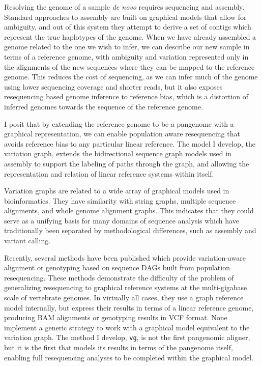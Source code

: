 \documentclass[a4paper,12pt,numbered,oneside]{Classes/PhDThesisPSnPDF}
\begin{document}
Resolving the genome of a sample \emph{de novo} requires sequencing and assembly.
Standard approaches to assembly are built on graphical models that allow for ambiguity, and out of this system they attempt to derive a set of contigs which represent the true haplotypes of the genome.
When we have already assembled a genome related to the one we wish to infer, we can describe our new sample in terms of a reference genome, with ambiguity and variation represented only in the alignments of the new sequences where they can be mapped to the reference genome.
This reduces the cost of sequencing, as we can infer much of the genome using lower sequencing coverage and shorter reads, but it also exposes resequencing based genome inference to reference bias, which is a distortion of inferred genomes towards the sequence of the reference genome.

I posit that by extending the reference genome to be a pangenome with a graphical representation, we can enable population aware resequencing that avoids reference bias to any particular linear reference.
The model I develop, the variation graph, extends the bidirectional sequence graph models used in assembly to support the labeling of paths through the graph, and allowing the representation and relation of linear reference systems within itself.

Variation graphs are related to a wide array of graphical models used in bioinformatics.
They have similarity with string graphs, multiple sequence alignments, and whole genome alignment graphs.
This indicates that they could serve as a unifying basis for many domains of sequence analysis which have traditionally been separated by methodological differences, such as assembly and variant calling.

Recently, several methods have been published which provide variation-aware alignment or genotyping based on sequence DAGs built from population resequencing.
These methods demonstrate the difficulty of the problem of generalizing resequencing to graphical reference systems at the multi-gigabase scale of vertebrate genomes.
In virtually all cases, they use a graph reference model internally, but express their results in terms of a linear reference genome, producing BAM alignments or genotyping results in VCF format.
None implement a generic strategy to work with a graphical model equivalent to the variation graph.
The method I develop, {\tt vg}, is not the first pangenomic aligner, but it is the first that models its results in terms of the pangenome itself, enabling full resequencing analyses to be completed within the graphical model.
\end{document}
